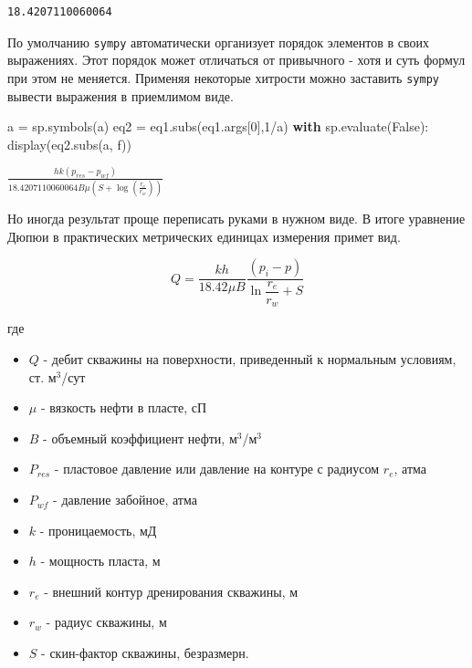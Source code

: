 \documentclass[
  russian,
  letterpaper,
  DIV=11,
  numbers=noendperiod,
  oneside]{scrartcl}
\newenvironment{Shaded}{\begin{snugshade}}{\end{snugshade}}
\newcommand{\ControlFlowTok}[1]{\textcolor[rgb]{0.00,0.23,0.31}{\textbf{#1}}}
\newcommand{\DecValTok}[1]{\textcolor[rgb]{0.68,0.00,0.00}{#1}}
\newcommand{\NormalTok}[1]{\textcolor[rgb]{0.00,0.23,0.31}{#1}}
\newcommand{\OperatorTok}[1]{\textcolor[rgb]{0.37,0.37,0.37}{#1}}
\newcommand{\StringTok}[1]{\textcolor[rgb]{0.13,0.47,0.30}{#1}}
\newcommand{\VariableTok}[1]{\textcolor[rgb]{0.07,0.07,0.07}{#1}}
\providecommand{\tightlist}{%
  \setlength{\itemsep}{0pt}\setlength{\parskip}{0pt}}
\begin{document}
\begin{verbatim}
18.4207110060064
\end{verbatim}

По умолчанию \texttt{sympy} автоматически организует порядок элементов в
своих выражениях. Этот порядок может отличаться от привычного - хотя и
суть формул при этом не меняется. Применяя некоторые хитрости можно
заставить \texttt{sympy} вывести выражения в приемлимом виде.

\begin{Shaded}
\begin{Highlighting}[]
\NormalTok{a }\OperatorTok{=}\NormalTok{ sp.symbols(}\StringTok{\textquotesingle{}a\textquotesingle{}}\NormalTok{)}
\NormalTok{eq2 }\OperatorTok{=}\NormalTok{ eq1.subs(eq1.args[}\DecValTok{0}\NormalTok{],}\DecValTok{1}\OperatorTok{/}\NormalTok{a)}
\ControlFlowTok{with}\NormalTok{ sp.evaluate(}\VariableTok{False}\NormalTok{):}
\NormalTok{    display(eq2.subs(a, f))}
\end{Highlighting}
\end{Shaded}

$\displaystyle \frac{h k \left(p_{res} - p_{wf}\right)}{18.4207110060064 B \mu \left(S + \log{\left(\frac{r_{e}}{r_{w}} \right)}\right)}$

Но иногда результат проще переписать руками в нужном виде. В итоге
уравнение Дюпюи в практических метрических единицах измерения примет
вид.

\[ 
Q = \frac{ kh}{18.42  \mu B} \frac{  \left( p_i - p \right) } {\ln{\dfrac{r_e}{r_w}} +S } 
\]

где

\begin{itemize}
\tightlist
\item
  \(Q\) - дебит скважины на поверхности, приведенный к нормальным
  условиям, ст. м\(^3\)/сут
\item
  \(\mu\) - вязкость нефти в пласте, сП
\item
  \(B\) - объемный коэффициент нефти, м\(^3\)/м\(^3\)
\item
  \(P_{res}\) - пластовое давление или давление на контуре с радиусом
  \(r_e\), атма
\item
  \(P_{wf}\) - давление забойное, атма
\item
  \(k\) - проницаемость, мД
\item
  \(h\) - мощность пласта, м
\item
  \(r_e\) - внешний контур дренирования скважины, м
\item
  \(r_w\) - радиус скважины, м
\item
  \(S\) - скин-фактор скважины, безразмерн.
\end{itemize}
\end{document}

